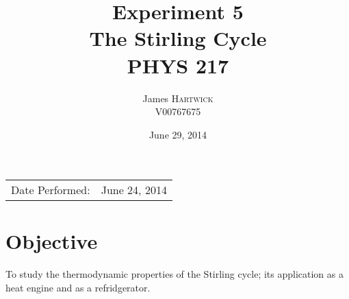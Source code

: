\documentclass{article}
\title{Experiment 5 \\ The Stirling Cycle \\ PHYS 217} %
\author{James \textsc{Hartwick}\\ V00767675} %
\date{June 29, 2014} %
\begin{document}
\maketitle %

\begin{center}
\begin{tabular}{l r}
Date Performed: & June 24, 2014 \\ %
\end{tabular}
\end{center}



\section{Objective}

To study the thermodynamic properties of the Stirling cycle; its application as a heat engine and as a refridgerator.



\end{document}
